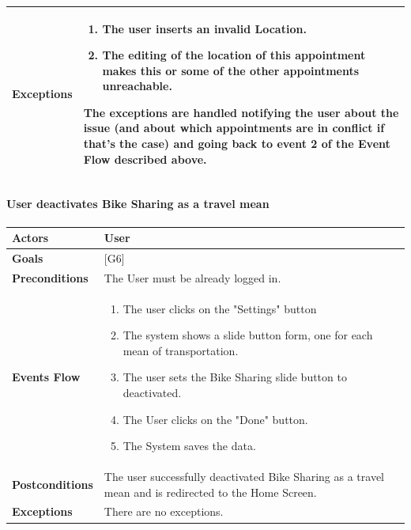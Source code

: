 \documentclass[12pt]{article}
\begin{document}
\begin{center}
\begin{tabular} { |p{}|p{}| }
        \hline
        \textbf{Exceptions} & \begin{enumerate}[topsep=0pt] 
                            \setlength{\itemsep}{0.5pt}
                            \item The user inserts an invalid Location.
                            \item The editing of the location of this appointment makes this or some of the other appointments unreachable.
                            \end{enumerate} 
                            The exceptions are handled notifying the user about the issue (and about which appointments are in conflict if that's the case) and going back to event 2 of the Event Flow described above.\\ 
        \hline
    \end{tabular}
\end{center}

\newpage

\paragraph{User deactivates Bike Sharing as a travel mean}
\begin{center}
    \begin{tabular} { |p{}|p{}| }
        \hline
        \textbf{Actors} & User \\ 
        \hline
        \textbf{Goals} & {[G6]} \\ 
        \hline  
        \textbf{Preconditions} & The User must be already logged in. \\ 
        \hline
        \textbf{Events Flow} & \begin{enumerate}[topsep=0pt] 
                            \setlength{\itemsep}{0.5pt}
                            \item The user clicks on the "Settings" button
                            \item The system shows a slide button form, one for each mean of transportation.
                            \item The user sets the Bike Sharing slide button to deactivated.
                            \item The User clicks on the "Done" button.
                            \item The System saves the data.
                            \end{enumerate} \\
        \hline
        \textbf{Postconditions} & The user successfully deactivated Bike Sharing as a travel mean and is redirected to the Home Screen. \\
        \hline
        \textbf{Exceptions} & There are no exceptions.\\ 
        \hline
     \end{tabular}
\end{center}
\end{document}
